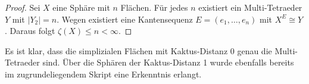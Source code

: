\documentclass[12pt,titlepage,twoside,cleardoublepage]{article}
\theoremstyle{nummermitklammern}
\numberwithin{equation}{section}
\DeclareMathOperator{\Pot}{Pot}
\begin{document}
\begin{proof}

Sei $X$ eine Sphäre mit $n$ Flächen. Für jedes $n$ existiert ein  Multi-Tetraeder $Y$ mit $\vert Y_2\vert =n .$ Wegen  existiert eine Kantensequenz $E=(e_1,\ldots,e_n)$ mit $X^E\cong Y$. Daraus folgt $\zeta(X)\leq n<\infty.$ 

\end{proof}
Es ist klar, dass die simplizialen Flächen mit Kaktus-Distanz $0$ genau die Multi-Tetraeder sind. Über die Sphären der Kaktus-Distanz 1 wurde ebenfalls bereits im zugrundeliegendem Skript eine Erkenntnis erlangt.
\end{document}
